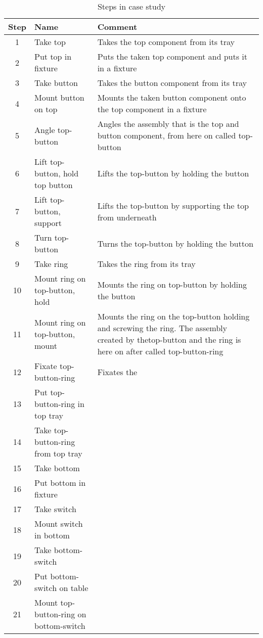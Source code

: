 \documentclass{standalone}
\begin{document}
\begin{table}
\centering
\begin{tabular}{c|l|p{6cm}}
Step & Name                                  & Comment\\
\hline
1   & Take top                               & Takes the top component from its tray\\
2   & Put top in fixture                     & Puts the taken top component and puts it in a fixture\\
3   & Take button                            & Takes the button component from its tray\\
4   & Mount button on top                    & Mounts the taken button component onto the top component in a fixture\\
5   & Angle top-button                       & Angles the assembly that is the top and button component, from here on called top-button\\
6   & Lift top-button, hold top button       & Lifts the top-button by holding the button\\
7   & Lift top-button, support               & Lifts the top-button by supporting the top from underneath\\
8   & Turn top-button                        & Turns the top-button by holding the button\\
9   & Take ring                              & Takes the ring from its tray\\
10  & Mount ring on top-button, hold         & Mounts the ring on top-button by holding the button\\
11  & Mount ring on top-button, mount        & Mounts the ring on the top-button holding and screwing the ring. The assembly created by thetop-button and the ring is here on after called top-button-ring\\
12  & Fixate top-button-ring                 & Fixates the \\
13  & Put top-button-ring in top tray        &\\
14  & Take top-button-ring from top tray     &\\
15  & Take bottom                            &\\
16  & Put bottom in fixture                  &\\
17  & Take switch                            &\\
18  & Mount switch in bottom                 &\\
19  & Take bottom-switch                     &\\
20  & Put bottom-switch on table             &\\
21  & Mount top-button-ring on bottom-switch &\\
\end{tabular}
\caption{Steps in case study}\label{tab:assembly_steps}
\end{table}
\end{document}
